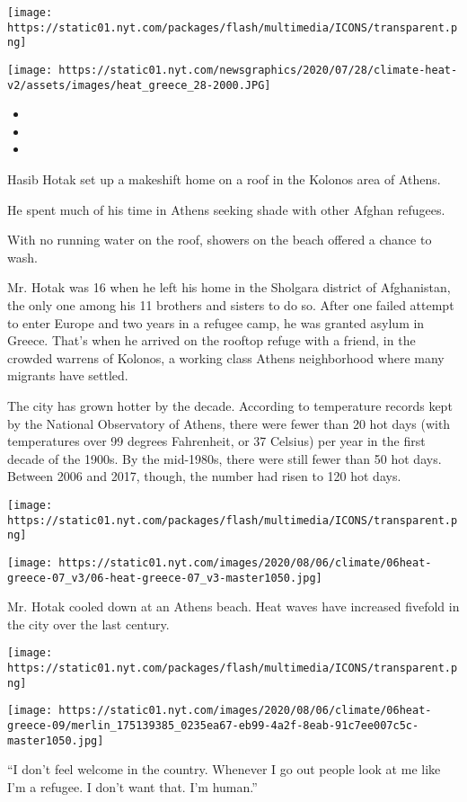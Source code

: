 \texttt{[image: https://static01.nyt.com/packages/flash/multimedia/ICONS/transparent.png]}

\texttt{[image: https://static01.nyt.com/newsgraphics/2020/07/28/climate-heat-v2/assets/images/heat\_greece\_28-2000.JPG]}

\begin{itemize}
\item
\item
\item
\end{itemize}

Hasib Hotak set up a makeshift home on a roof in the Kolonos area of
Athens.

He spent much of his time in Athens seeking shade with other Afghan
refugees.

With no running water on the roof, showers on the beach offered a chance
to wash.

Mr. Hotak was 16 when he left his home in the Sholgara district of
Afghanistan, the only one among his 11 brothers and sisters to do so.
After one failed attempt to enter Europe and two years in a refugee
camp, he was granted asylum in Greece. That's when he arrived on the
rooftop refuge with a friend, in the crowded warrens of Kolonos, a
working class Athens neighborhood where many migrants have settled.

The city has grown hotter by the decade. According to temperature
records kept by the National Observatory of Athens, there were fewer
than 20 hot days (with temperatures over 99 degrees Fahrenheit, or 37
Celsius) per year in the first decade of the 1900s. By the mid-1980s,
there were still fewer than 50 hot days. Between 2006 and 2017, though,
the number had risen to 120 hot days.

\texttt{[image: https://static01.nyt.com/packages/flash/multimedia/ICONS/transparent.png]}

\texttt{[image: https://static01.nyt.com/images/2020/08/06/climate/06heat-greece-07\_v3/06-heat-greece-07\_v3-master1050.jpg]}

Mr. Hotak cooled down at an Athens beach. Heat waves have increased
fivefold in the city over the last century.

\texttt{[image: https://static01.nyt.com/packages/flash/multimedia/ICONS/transparent.png]}

\texttt{[image: https://static01.nyt.com/images/2020/08/06/climate/06heat-greece-09/merlin\_175139385\_0235ea67-eb99-4a2f-8eab-91c7ee007c5c-master1050.jpg]}

``I don't feel welcome in the country. Whenever I go out people look at
me like I'm a refugee. I don't want that. I'm human.''

